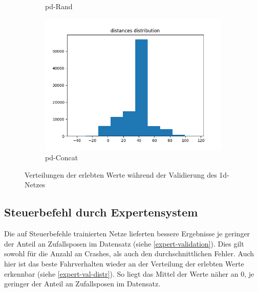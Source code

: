 \begin{figure}[H]
\begin{subfigure}[h]{0.3\textwidth}
		\caption{\glqq\acs{pd}-Rand\grqq}
		\label{1d-pd-rand-val-distr}
	\end{subfigure}
	\begin{subfigure}[h]{0.3\textwidth}
		\centering
		\includegraphics[width=\linewidth]{kapitel5/images/eval/d-only/pd-concat-distr.png}
		\caption{\glqq\acs{pd}-Concat\grqq}
		\label{1d-pd-concat-val-distr}
	\end{subfigure}
	\caption{Verteilungen der erlebten Werte während der Validierung des \acs{1d}-Netzes}
	\label{1d-val-distr}
\end{figure}

\subsection{Steuerbefehl durch Expertensystem}

Die auf Steuerbefehle trainierten Netze lieferten bessere Ergebnisse je geringer der Anteil an Zufallsposen im Datensatz (siehe \ref{expert-validation}). Dies gilt sowohl für die Anzahl an Crashes, als auch den durchschnittlichen Fehler.
Auch hier ist das beste Fahrverhalten wieder an der Verteilung der erlebten Werte erkennbar (siehe \ref{expert-val-distr}). So liegt das Mittel der Werte näher an 0, je geringer der Anteil an Zufallsposen im Datensatz.

